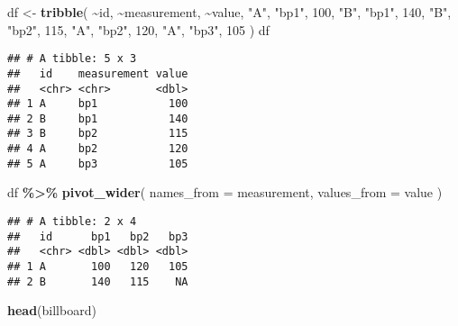 \documentclass[
]{article}
\newenvironment{Shaded}{\begin{snugshade}}{\end{snugshade}}
\newcommand{\AttributeTok}[1]{\textcolor[rgb]{0.13,0.29,0.53}{#1}}
\newcommand{\DecValTok}[1]{\textcolor[rgb]{0.00,0.00,0.81}{#1}}
\newcommand{\FunctionTok}[1]{\textcolor[rgb]{0.13,0.29,0.53}{\textbf{#1}}}
\newcommand{\NormalTok}[1]{#1}
\newcommand{\OtherTok}[1]{\textcolor[rgb]{0.56,0.35,0.01}{#1}}
\newcommand{\SpecialCharTok}[1]{\textcolor[rgb]{0.81,0.36,0.00}{\textbf{#1}}}
\newcommand{\StringTok}[1]{\textcolor[rgb]{0.31,0.60,0.02}{#1}}
\begin{document}
\begin{Shaded}
\begin{Highlighting}[]
\NormalTok{df }\OtherTok{\textless{}{-}} \FunctionTok{tribble}\NormalTok{(}
 \SpecialCharTok{\textasciitilde{}}\NormalTok{id, }\SpecialCharTok{\textasciitilde{}}\NormalTok{measurement, }\SpecialCharTok{\textasciitilde{}}\NormalTok{value,}
 \StringTok{"A"}\NormalTok{, }\StringTok{"bp1"}\NormalTok{, }\DecValTok{100}\NormalTok{,}
 \StringTok{"B"}\NormalTok{, }\StringTok{"bp1"}\NormalTok{, }\DecValTok{140}\NormalTok{,}
 \StringTok{"B"}\NormalTok{, }\StringTok{"bp2"}\NormalTok{, }\DecValTok{115}\NormalTok{, }
 \StringTok{"A"}\NormalTok{, }\StringTok{"bp2"}\NormalTok{, }\DecValTok{120}\NormalTok{,}
 \StringTok{"A"}\NormalTok{, }\StringTok{"bp3"}\NormalTok{, }\DecValTok{105}
\NormalTok{)}
\NormalTok{df}
\end{Highlighting}
\end{Shaded}

\begin{verbatim}
## # A tibble: 5 x 3
##   id    measurement value
##   <chr> <chr>       <dbl>
## 1 A     bp1           100
## 2 B     bp1           140
## 3 B     bp2           115
## 4 A     bp2           120
## 5 A     bp3           105
\end{verbatim}

\begin{Shaded}
\begin{Highlighting}[]
\NormalTok{df }\SpecialCharTok{\%\textgreater{}\%} 
 \FunctionTok{pivot\_wider}\NormalTok{(}
 \AttributeTok{names\_from =}\NormalTok{ measurement,}
 \AttributeTok{values\_from =}\NormalTok{ value}
\NormalTok{ )}
\end{Highlighting}
\end{Shaded}

\begin{verbatim}
## # A tibble: 2 x 4
##   id      bp1   bp2   bp3
##   <chr> <dbl> <dbl> <dbl>
## 1 A       100   120   105
## 2 B       140   115    NA
\end{verbatim}

\begin{Shaded}
\begin{Highlighting}[]
\FunctionTok{head}\NormalTok{(billboard)}
\end{Highlighting}
\end{Shaded}
\end{document}
